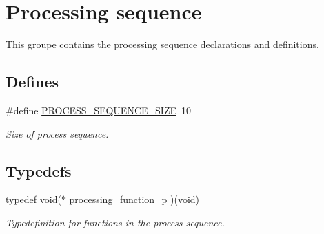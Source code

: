 \hypertarget{group__proc__sequence}{
\section{\-Processing sequence}
\label{group__proc__sequence}
}


\-This groupe contains the processing sequence declarations and definitions.  


\subsection*{\-Defines}
\begin{DoxyCompactItemize}
\item 
\#define \hyperlink{group__proc__sequence_gaeda836195bc58fa7dc02a15d8b6e37ff}{\-P\-R\-O\-C\-E\-S\-S\-\_\-\-S\-E\-Q\-U\-E\-N\-C\-E\-\_\-\-S\-I\-Z\-E}~10
\begin{DoxyCompactList}\small\item\em \-Size of process sequence. \end{DoxyCompactList}\end{DoxyCompactItemize}
\subsection*{\-Typedefs}
\begin{DoxyCompactItemize}
\item 
typedef void($\ast$ \hyperlink{group__proc__sequence_ga5fcb98b03e729c4ec685656d28ba37e2}{processing\-\_\-function\-\_\-p} )(void)
\begin{DoxyCompactList}\small\item\em \-Typedefinition for functions in the process sequence. \end{DoxyCompactList}\end{DoxyCompactItemize}
